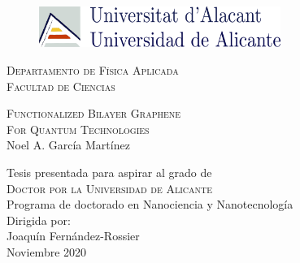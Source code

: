 \begin{titlepage}
\addtocounter{page}{-1}%

\vspace{20pt}
\begin{figure}[!ht]
\centering
\includegraphics[width=0.7\textwidth]{logo_ua.pdf}
\end{figure}

\begin{center}
\begingroup \linespread{1,75} 
\textsc{\large{Departamento de Física Aplicada}}\\
\textsc{\large{Facultad de Ciencias}}\\[1,5cm]
\endgroup

\begingroup \linespread{1,75} \selectfont
\textsc{{\LARGE
      Functionalized Bilayer Graphene\\
      For Quantum Technologies}}\\[1,5cm]
Noel A. García Martínez\\[2,5cm]
\endgroup

Tesis presentada para aspirar al grado de\\
\textsc{Doctor por la Universidad de Alicante}\\[1.5cm]
Programa de doctorado en Nanociencia y Nanotecnología\\[2cm]

Dirigida por:\\
Joaquín Fernández-Rossier\\[2cm]

Noviembre 2020
\end{center}

\vfill
\end{titlepage}
